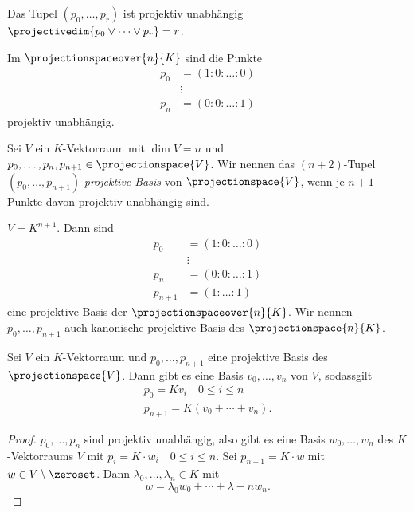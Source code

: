 \begin{bemerkungen*}
  Das Tupel \( (p_0,\dotsc,p_r) \) ist projektiv unabhängig \gdw \( \projectivedim{p_0\vee \dotsb\vee p_r}=r \).
\end{bemerkungen*}
\begin{beispiel*}
  Im \( \projectionspaceover{n}{K} \) sind die Punkte
  \begin{align*}
    p_0&=(1:0:\dotsc:0)\\
    &\vdots\\
    p_n&=(0:0:\dotsc:1)
  \end{align*}
  projektiv unabhängig.
\end{beispiel*}
\begin{definition*}
  Sei \( V \) ein \( K \)-Vektorraum mit \( \dim V=n \) und \( p_0,\dotsc,p_n,p_{n+1}\in \projectionspace{V} \). Wir nennen das \( (n+2) \)-Tupel \( (p_0,\dotsc,p_{n+1}) \) \emph{projektive Basis} von \( \projectionspace{V} \), wenn je \( n+1 \) Punkte davon projektiv unabhängig sind.
\end{definition*}
\begin{beispiel*}
  \( V=K^{n+1} \). Dann sind
  \begin{align*}
    p_0&=(1:0:\dotsc:0)\\
    &\vdots\\
    p_n&=(0:0:\dotsc:1)\\
    p_{n+1}&=(1:\dotsc:1)
  \end{align*}
  eine projektive Basis der \( \projectionspaceover{n}{K} \). Wir nennen \( p_0,\dotsc,p_{n+1}  \) auch kanonische projektive Basis des \( \projectionspace{n}{K} \).
\end{beispiel*}
\begin{lemma}
  Sei \( V \) ein \( K \)-Vektorraum und \( p_0,\dotsc,p_{n+1} \) eine projektive Basis des \( \projectionspace{V} \). Dann gibt es eine Basis \( v_0,\dots,v_n \) von \( V \), sodassgilt
  \begin{gather*}
    p_0=Kv_i\quad 0\leq i\leq n\\
    p_{n+1}=K(v_0+\dotsb+v_n).
  \end{gather*}
\end{lemma}
\begin{proof}
  \( p_0,\dotsc,p_n \) sind projektiv unabhängig, also gibt es eine Basis \( w_0,\dotsc,w_n \) des \( K \)-Vektorraums \( V \) mit \( p_i=K\cdot w_i \quad 0\leq i\leq n\). Sei \( p_{n+1}=K\cdot w \) mit \( w\in V\setminus\zeroset \). Dann \texists \( \lambda_0,\dotsc,\lambda_n\in K \) mit 
  \begin{equation*}
    w=\lambda_0 w_0+\dotsb+\lambda-n w_n.
  \end{equation*}
\end{proof}
